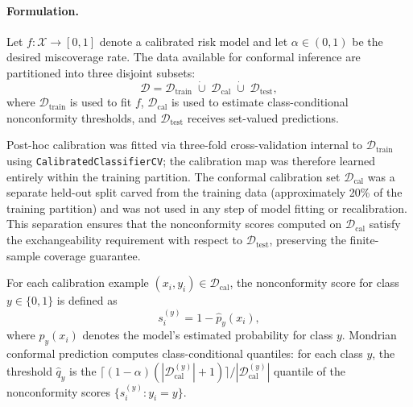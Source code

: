 \documentclass[11pt]{article}
\begin{document}
\paragraph{Formulation.}
Let $f: \mathcal{X} \to [0,1]$ denote a calibrated risk model and let
$\alpha \in (0,1)$ be the desired miscoverage rate.  The data available for
conformal inference are partitioned into three disjoint subsets:
\begin{equation}\label{eq:conformal-split}
  \mathcal{D} = \mathcal{D}_{\text{train}}
  \;\dot\cup\; \mathcal{D}_{\text{cal}}
  \;\dot\cup\; \mathcal{D}_{\text{test}},
\end{equation}
where $\mathcal{D}_{\text{train}}$ is used to fit $f$,
$\mathcal{D}_{\text{cal}}$ is used to estimate class-conditional nonconformity
thresholds, and $\mathcal{D}_{\text{test}}$ receives set-valued predictions.

Post-hoc calibration was fitted via three-fold cross-validation internal to $\mathcal{D}_{\text{train}}$ using \texttt{CalibratedClassifierCV}; the calibration map was therefore learned entirely within the training partition. The conformal calibration set $\mathcal{D}_{\text{cal}}$ was a separate held-out split carved from the training data (approximately 20\% of the training partition) and was not used in any step of model fitting or recalibration. This separation ensures that the nonconformity scores computed on $\mathcal{D}_{\text{cal}}$ satisfy the exchangeability requirement with respect to $\mathcal{D}_{\text{test}}$, preserving the finite-sample coverage guarantee.

For each calibration example $(x_i, y_i) \in \mathcal{D}_{\text{cal}}$, the
nonconformity score for class $y \in \{0,1\}$ is defined as
\begin{equation}\label{eq:nonconformity}
  s_i^{(y)} = 1 - \hat{p}_y(x_i),
\end{equation}
where $\hat{p}_y(x_i)$ denotes the model's estimated probability for class $y$.
Mondrian conformal prediction computes class-conditional quantiles: for each
class $y$, the threshold $\hat{q}_y$ is the $\lceil (1-\alpha)(|\mathcal{D}_{\text{cal}}^{(y)}| + 1) \rceil / |\mathcal{D}_{\text{cal}}^{(y)}|$
quantile of the nonconformity scores $\{s_i^{(y)} : y_i = y\}$.
\end{document}
